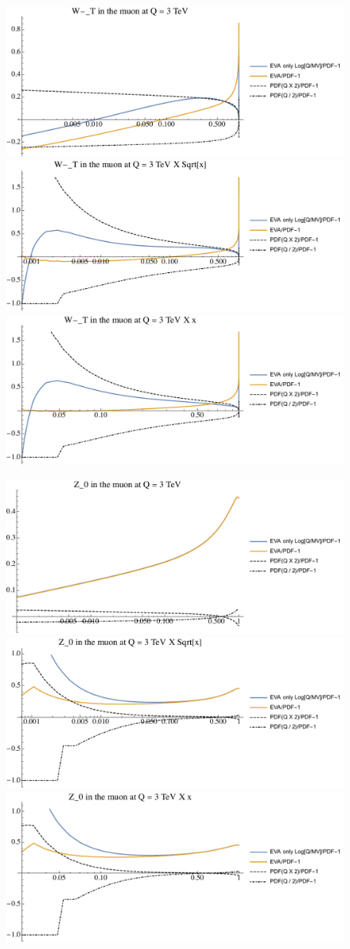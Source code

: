 \documentclass[a4paper,11pt]{article}
\begin{document}
\begin{figure}[ht]
\includegraphics[width=0.4\linewidth]{PlotPDFs/ratios/3TeV/W-_T_Q.pdf}
\includegraphics[width=0.4\linewidth]{PlotPDFs/ratios/3TeV/W-_T_Qsqrtx.pdf}
\includegraphics[width=0.4\linewidth]{PlotPDFs/ratios/3TeV/W-_T_Qx.pdf}
\end{figure}

\begin{figure}[ht]
\includegraphics[width=0.4\linewidth]{PlotPDFs/ratios/3TeV/Z_0_Q.pdf}
\includegraphics[width=0.4\linewidth]{PlotPDFs/ratios/3TeV/Z_0_Qsqrtx.pdf}
\includegraphics[width=0.4\linewidth]{PlotPDFs/ratios/3TeV/Z_0_Qx.pdf}
\end{figure}
\end{document}
